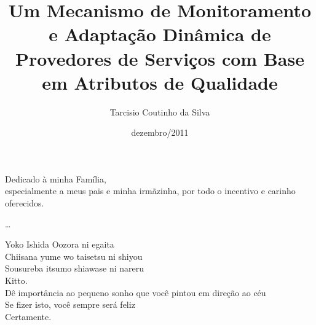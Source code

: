 \documentclass[pt,bsc,oneside,onehalfspacing]{risethesis}
\title{Um Mecanismo de Monitoramento e Adaptação Dinâmica de Provedores de Serviços com Base em Atributos de Qualidade}
\date{dezembro/2011}
\author{Tarcisio Coutinho da Silva}
\begin{document}
\frontmatter
\frontpage
\presentationpage

\begin{dedicatory}
Dedicado à minha Família, \\
especialmente a meus pais e minha irmãzinha, por todo o incentivo e carinho oferecidos.
\end{dedicatory}

\acknowledgements
\ldots

\begin{epigraph}{Yoko Ishida}
Oozora ni egaita\\
Chiisana yume wo taisetsu ni shiyou\\
Sousureba itsumo shiawase ni nareru\\
Kitto.\\
\vspace{0.5cm}
Dê importância ao pequeno sonho que você pintou em direção ao céu\\
Se fizer isto, você sempre será feliz\\
Certamente.
\vspace{0.2cm}
\end{epigraph}

\resumo


\abstract



\tableofcontents
\listoffigures
\listoftables


\mainmatter











\clearpage
\addappheadtotoc
\appendix
\appendixpage

\end{document}
